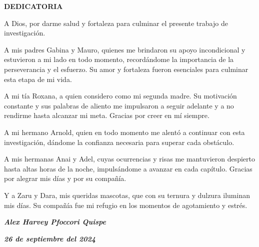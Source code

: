 \thispagestyle{plain}
\newpage

\begin{center}
  \textbf{DEDICATORIA}
\end{center}

\vspace{1cm}

A Dios, por darme salud y fortaleza para culminar el presente trabajo de investigación.

A mis padres Gabina y Mauro, quienes me brindaron su apoyo incondicional y estuvieron a mi lado en todo momento, recordándome la importancia de la perseverancia y el esfuerzo. Su amor y fortaleza fueron esenciales para culminar esta etapa de mi vida.

A mi tía Roxana, a quien considero como mi segunda madre. Su motivación constante y sus palabras de aliento me impulsaron a seguir adelante y a no rendirme hasta alcanzar mi meta. Gracias por creer en mí siempre.

A mi hermano Arnold, quien en todo momento me alentó a continuar con esta investigación, dándome la confianza necesaria para superar cada obstáculo.

A mis hermanas Anai y Adel, cuyas ocurrencias y risas me mantuvieron despierto hasta altas horas de la noche, impulsándome a avanzar en cada capítulo. Gracias por alegrar mis días y por su compañía.

Y a Zaru y Dara, mis queridas mascotas, que con su ternura y dulzura iluminan mis días. Su compañía fue mi refugio en los momentos de agotamiento y estrés.

\vspace{2cm}

\begin{flushright}
  \textbf{\textit{Alex Harvey Pfoccori Quispe}}

  \textbf{\textit{26 de septiembre del 2024}}
\end{flushright}

\newpage